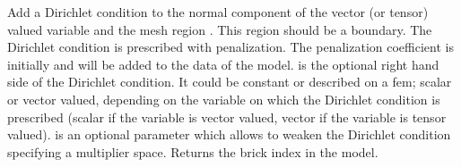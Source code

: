 \documentclass[a4paper,11pt,english]{sphinxmanual}
\begin{document}
\begin{fulllineitems}
\begin{fulllineitems}
\label{\detokenize{python/cmdref_Model:getfem.Model.add_normal_Dirichlet_condition_with_penalization}}
Add a Dirichlet condition to the normal component of the vector
(or tensor) valued variable  and the mesh
region . This region should be a boundary. The Dirichlet
condition is prescribed with penalization. The penalization coefficient
is initially  and will be added to the data of the model.
 is the optional right hand side of the Dirichlet condition.
It could be constant or described on a fem; scalar or vector valued,
depending on the variable on which the Dirichlet condition is prescribed
(scalar if the variable
is vector valued, vector if the variable is tensor valued).
 is an optional parameter which allows to weaken the
Dirichlet condition specifying a multiplier space.
Returns the brick index in the model.

\end{fulllineitems}



\end{fulllineitems}
\end{document}
